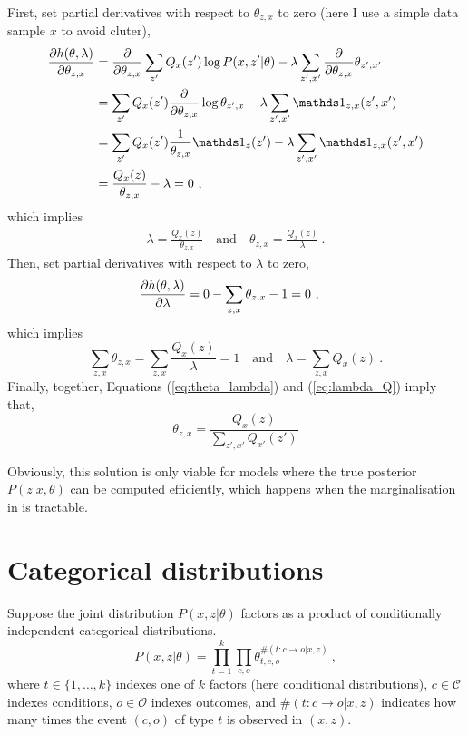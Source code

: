 First, set partial derivatives with respect to $\theta_{z,x}$ to zero (here I use a simple data sample $x$ to avoid cluter),
\begin{subequations}
\begin{align}
	\partiald{h(\theta, \lambda)}{\theta_{z,x}} &= \partiald{}{\theta_{z,x}} \sum_{z'} Q_x(z') \log P(x, z'|\theta)  - \lambda \sum_{z', x'} \partiald{}{\theta_{z,x}} \theta_{z', x'} \\
	 &= \sum_{z'} Q_x(z') \partiald{}{\theta_{z,x}} \log \theta_{z', x} - \lambda \sum_{z', x'} \mathds 1_{z,x}(z',x')  \\
	 &= \sum_{z'} Q_x(z') \frac{1}{\theta_{z,x}} \mathds 1_{z}(z') - \lambda \sum_{z', x'} \mathds 1_{z,x}(z',x')  \\
	 &= \frac{Q_x(z)}{\theta_{z, x}} - \lambda = 0~ ,
\end{align}
\end{subequations}
\noindent which implies 
\begin{align}
	\lambda = \frac{Q_x(z)}{\theta_{z, x}}  \quad{} \text{and} \quad{} \theta_{z, x} = \frac{Q_x(z)}{\lambda} ~ . \label{eq:theta_lambda}
\end{align}
Then, set partial derivatives with respect to $\lambda$ to zero,
\begin{align}
	\frac{\partial h(\theta, \lambda)}{\partial \lambda} 
	   &= 0 - \sum_{z, x} \theta_{z, x} -1 = 0 ~, 
\end{align}
\noindent which implies
\begin{equation}
	 \sum_{z, x} \theta_{z, x} = \sum_{z, x} \frac{Q_x(z)}{\lambda} = 1 \quad{} \text{and} \quad{} \lambda = \sum_{z, x} Q_x(z) ~. \label{eq:lambda_Q}
\end{equation}
\noindent Finally, together, Equations (\ref{eq:theta_lambda}) and (\ref{eq:lambda_Q}) imply that,
\begin{equation}
	\theta_{z, x} = \frac{Q_x(z)}{\sum_{z', x'} Q_{x'}(z')}
\end{equation}

Obviously, this solution is only viable for models where the true posterior $P(z|x, \theta)$ can be computed efficiently, which happens when the marginalisation in  is tractable.

\section{Categorical distributions}

Suppose the joint distribution $P(x, z|\theta)$ factors as a product of conditionally independent categorical distributions.
\begin{equation}
	P(x, z|\theta) = \prod_{t=1}^k \prod_{c, o} \theta_{t,c,o}^{\#(t:c \rightarrow o|x, z)} ~,
\end{equation}
where $t \in \{1, \ldots, k\}$ indexes one of $k$ factors (here conditional distributions), $c \in \mathcal C$ indexes conditions, $o \in \mathcal O$ indexes outcomes, and  $\#(t:c \rightarrow o|x, z)$ indicates how many times the event $(c, o)$ of type $t$ is observed in $(x, z)$.

